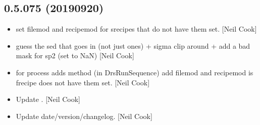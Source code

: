 \documentclass[a4paper,10pt,english]{report}
\begin{document}
\subsection{0.5.075 (2019\sphinxhyphen{}09\sphinxhyphen{}20)}
\label{\detokenize{misc/changelog:id87}}\begin{itemize}
\item {} 
 \sphinxhyphen{} set filemod and recipemod for
srecipes that do not have them set. {[}Neil Cook{]}

\item {} 
 \sphinxhyphen{} guess the sed that goes in (not just
ones) + sigma clip around  + add a bad mask for sp2 (set to NaN)
{[}Neil Cook{]}

\item {} 
 \sphinxhyphen{} for process adds method (in DrsRunSequence) add
filemod and recipemod is frecipe does not have them set. {[}Neil Cook{]}

\item {} 
Update . {[}Neil Cook{]}

\item {} 
Update date/version/changelog. {[}Neil Cook{]}

\end{itemize}
\end{document}
